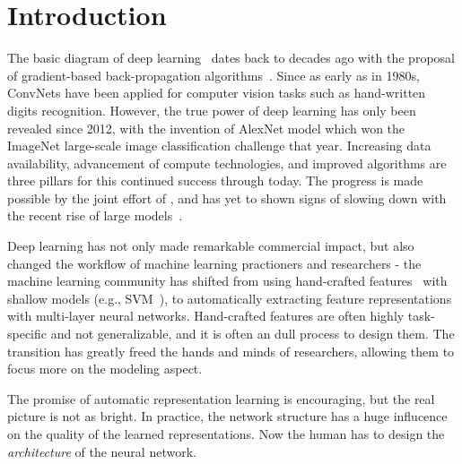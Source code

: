 \documentclass{ucbthesis}
\begin{document}
\pagestyle{headings}

\chapter{Introduction}

The basic diagram of deep learning~\cite{} dates back to decades ago with the proposal of gradient-based back-propagation algorithms~\cite{}. Since as early as in 1980s, ConvNets have been applied for computer vision tasks such as hand-written digits recognition. However, the true power of deep learning has only been revealed since 2012, with the invention of AlexNet model which won the ImageNet large-scale image classification challenge that year. Increasing data availability, advancement of compute technologies, and improved algorithms are three pillars for this continued success through today. The progress is made possible by the joint effort of , and has yet to shown signs of slowing down with the recent rise of large models~\cite{}.

Deep learning has not only made remarkable commercial impact, but also changed the workflow of machine learning practioners and researchers - the machine learning community has shifted from using hand-crafted features~\cite{Lowe2004,Dalal2005} with shallow models (e.g., SVM~\cite{Cortes1995}), to automatically extracting feature representations with multi-layer neural networks. Hand-crafted features are often highly task-specific and not generalizable, and it is often an dull process to design them. The transition has greatly freed the hands and minds of researchers, allowing them to focus more on the modeling aspect.

The promise of automatic representation learning is encouraging, but the real picture is not as bright. In practice, the network structure has a huge influcence on the quality of the learned representations. Now the human has to design the \emph{architecture} of the neural network. 






\end{document}
